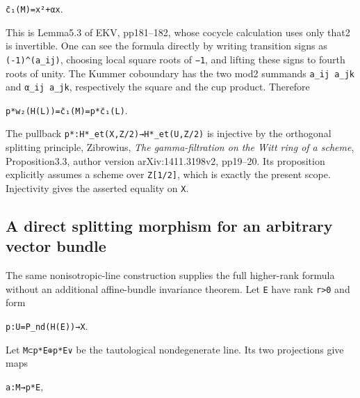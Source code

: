 \documentclass[
  10pt,
]{article}
\begin{document}
\texttt{\small c̄₁(\allowbreak{}M)\allowbreak{}=\allowbreak{}x²+\allowbreak{}αx}.

This is Lemma5.3 of EKV, pp181--182, whose cocycle calculation uses only
that2 is invertible. One can see the formula directly by writing
transition signs as
\texttt{\small (\allowbreak{}-\allowbreak{}1)\allowbreak{}\textasciicircum{}(\allowbreak{}a\_\allowbreak{}ij)\allowbreak{}},
choosing local square roots of \texttt{\small −1}, and lifting these
signs to fourth roots of unity. The Kummer coboundary has the two mod2
summands \texttt{\small a\_\allowbreak{}ij a\_\allowbreak{}jk} and
\texttt{\small α\_\allowbreak{}ij a\_\allowbreak{}jk}, respectively the
square and the cup product. Therefore

\texttt{\small p*w₂(\allowbreak{}H(\allowbreak{}L)\allowbreak{})\allowbreak{}=\allowbreak{}c̄₁(\allowbreak{}M)\allowbreak{}=\allowbreak{}p*c̄₁(\allowbreak{}L)\allowbreak{}}.

The pullback
\texttt{\small p*:\allowbreak{}H*\_\allowbreak{}et(\allowbreak{}X,\allowbreak{}Z/\allowbreak{}2)\allowbreak{}→\allowbreak{}H*\_\allowbreak{}et(\allowbreak{}U,\allowbreak{}Z/\allowbreak{}2)\allowbreak{}}
is injective by the orthogonal splitting principle, Zibrowius, \emph{The
gamma-filtration on the Witt ring of a scheme}, Proposition3.3, author
version arXiv:1411.3198v2, pp19--20. Its proposition explicitly assumes
a scheme over
\texttt{\small Z[\allowbreak{}1/\allowbreak{}2]\allowbreak{}}, which is
exactly the present scope. Injectivity gives the asserted equality on
\texttt{\small X}.

\subsection{A direct splitting morphism for an arbitrary vector
bundle}\label{a-direct-splitting-morphism-for-an-arbitrary-vector-bundle}

The same nonisotropic-line construction supplies the full higher-rank
formula without an additional affine-bundle invariance theorem. Let
\texttt{\small E} have rank \texttt{\small r>0} and form

\texttt{\small p:\allowbreak{}U=\allowbreak{}P\_\allowbreak{}nd(\allowbreak{}H(\allowbreak{}E)\allowbreak{})\allowbreak{}→\allowbreak{}X}.

Let \texttt{\small M⊂p*E⊕\allowbreak{}p*E∨} be the tautological
nondegenerate line. Its two projections give maps

\texttt{\small a:\allowbreak{}M→\allowbreak{}p*E},
\end{document}
